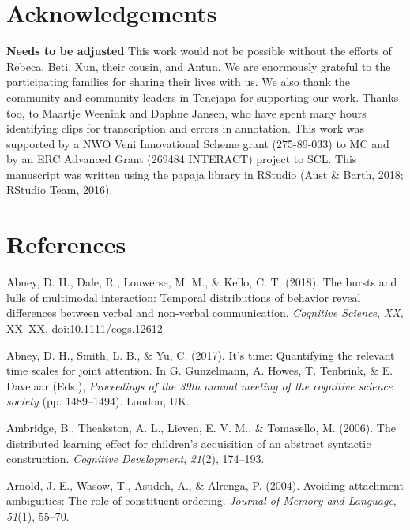\documentclass[floatsintext,man]{apa6}
\theoremstyle{definition}
\theoremstyle{definition}
\theoremstyle{definition}
\theoremstyle{remark}
\begin{document}
\section{Acknowledgements}\label{acknowledgements}

\textbf{Needs to be adjusted} This work would not be possible without
the efforts of Rebeca, Beti, Xun, their cousin, and Antun. We are
enormously grateful to the participating families for sharing their
lives with us. We also thank the community and community leaders in
Tenejapa for supporting our work. Thanks too, to Maartje Weenink and
Daphne Jansen, who have spent many hours identifying clips for
transcription and errors in annotation. This work was supported by a NWO
Veni Innovational Scheme grant (275-89-033) to MC and by an ERC Advanced
Grant (269484 INTERACT) project to SCL. This manuscript was written
using the papaja library in RStudio (Aust \& Barth, 2018; RStudio Team,
2016).

\newpage

\section{References}\label{refs}

\begingroup
\setlength{\parindent}{-0.5in} \setlength{\leftskip}{0.5in}

\hypertarget{refs}{}
\hypertarget{ref-abney2018bursts}{}
Abney, D. H., Dale, R., Louwerse, M. M., \& Kello, C. T. (2018). The
bursts and lulls of multimodal interaction: Temporal distributions of
behavior reveal differences between verbal and non-verbal communication.
\emph{Cognitive Science}, \emph{XX}, XX--XX.
doi:\href{https://doi.org/10.1111/cogs.12612}{10.1111/cogs.12612}

\hypertarget{ref-abney2017time}{}
Abney, D. H., Smith, L. B., \& Yu, C. (2017). It's time: Quantifying the
relevant time scales for joint attention. In G. Gunzelmann, A. Howes, T.
Tenbrink, \& E. Davelaar (Eds.), \emph{Proceedings of the 39th annual
meeting of the cognitive science society} (pp. 1489--1494). London, UK.

\hypertarget{ref-ambridge2006distributed}{}
Ambridge, B., Theakston, A. L., Lieven, E. V. M., \& Tomasello, M.
(2006). The distributed learning effect for children's acquisition of an
abstract syntactic construction. \emph{Cognitive Development},
\emph{21}(2), 174--193.

\hypertarget{ref-arnold2004avoiding}{}
Arnold, J. E., Wasow, T., Asudeh, A., \& Alrenga, P. (2004). Avoiding
attachment ambiguities: The role of constituent ordering. \emph{Journal
of Memory and Language}, \emph{51}(1), 55--70.
\end{document}
